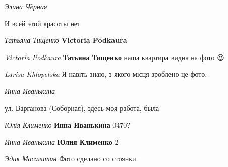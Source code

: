  
 
 
 
 

\qqSecCmt

\emph{Элина Чёрная}

И всей этой красоты нет

\emph{Татьяна Тищенко}
\textbf{Victoria Podkaura}

\emph{Victoria Podkaura}
\textbf{Татьяна Тищенко} наша квартира видна на фото 😍

\emph{Larisa Khlopetska}
Я навіть знаю, з якого місця зроблено це фото.

\emph{Инна Иванькина}

ул. Варганова (Соборная), здесь моя работа, была

\emph{Юлія Клименко}
\textbf{Инна Иванькина} 0470?

\emph{Инна Иванькина}
\textbf{Юлия Клименко} 2

\emph{Эдик Масалитин}
Фото сделано со стоянки.
